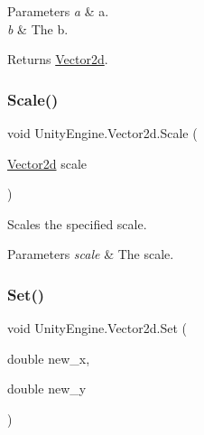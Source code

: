 \begin{DoxyParams}{Parameters}
{\em a} & a.\\
\hline
{\em b} & The b.\\
\hline
\end{DoxyParams}
\begin{DoxyReturn}{Returns}
\hyperlink{struct_unity_engine_1_1_vector2d}{Vector2d}.
\end{DoxyReturn}
\mbox{\label{struct_unity_engine_1_1_vector2d_a3cedcd488480122404c3571e151af24e}} 
\subsubsection{\texorpdfstring{Scale()}{Scale()}\hspace{0.1cm}{\footnotesize\ttfamily [2/2]}}
{\footnotesize\ttfamily void Unity\+Engine.\+Vector2d.\+Scale (\begin{DoxyParamCaption}\item[{\hyperlink{struct_unity_engine_1_1_vector2d}{Vector2d}}]{scale }\end{DoxyParamCaption})\hspace{0.3cm}{\ttfamily [inline]}}



Scales the specified scale. 


\begin{DoxyParams}{Parameters}
{\em scale} & The scale.\\
\hline
\end{DoxyParams}
\mbox{\label{struct_unity_engine_1_1_vector2d_a9d112a98ba6be5be962139b335bef50a}} 
\subsubsection{\texorpdfstring{Set()}{Set()}}
{\footnotesize\ttfamily void Unity\+Engine.\+Vector2d.\+Set (\begin{DoxyParamCaption}\item[{double}]{new\+\_\+x,  }\item[{double}]{new\+\_\+y }\end{DoxyParamCaption})\hspace{0.3cm}{\ttfamily [inline]}}



